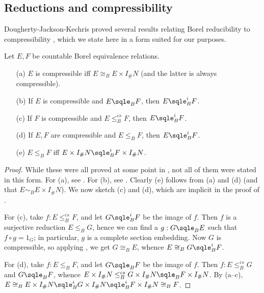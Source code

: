 \documentclass[11pt]{article}
\begin{document}
\subsection{Reductions and compressibility}
\label{sec:compress}

Dougherty-Jackson-Kechris proved several results relating Borel reducibility to compressibility \cite[2.3, 2.5, 2.6]{DJK}, which we state here in a form suited for our purposes.

\begin{proposition}
\label{thm:compress}
Let $E, F$ be countable Borel equivalence relations.
\begin{enumerate}
\item[(a)]  $E$ is compressible iff $E \cong_B E \times I_\#N$ (and the latter is always compressible).
\item[(b)]  If $E$ is compressible and $E \sqle_B F$, then $E \sqle_B^i F$.
\item[(c)]  If $F$ is compressible and $E \le_B^{cs} F$, then $E \sqle_B^i F$.
\item[(d)]  If $E, F$ are compressible and $E \le_B F$, then $E \sqle_B^i F$.
\item[(e)]  $E \le_B F$ iff $E \times I_\#N \sqle_B^i F \times I_\#N$.
\end{enumerate}
\end{proposition}
\begin{proof}
While these were all proved at some point in \cite{DJK}, not all of them were stated in this form.  For (a), see \cite[2.5]{DJK}.  For (b), see \cite[2.3]{DJK}.  Clearly (e) follows from (a) and (d) (and that $E \sim_B E \times I_\#N$).  We now sketch (c) and (d), which are implicit in the proof of \cite[2.6]{DJK}.

For (c), take $f : E \le_B^{cs} F$, and let $G \sqle_B^i F$ be the image of $f$.  Then $f$ is a surjective reduction $E \le_B G$, hence we can find a $g : G \sqle_B E$ such that $f \circ g = 1_G$; in particular, $g$ is a complete section embedding.  Now $G$ is compressible, so applying \cite[2.2]{DJK}, we get $G \cong_B E$, whence $E \cong_B G \sqle_B^i F$.

For (d), take $f : E \le_B F$, and let $G \sqle_B F$ be the image of $f$.  Then $f : E \le_B^{cs} G$ and $G \sqle_B F$, whence $E \times I_\#N \le_B^{cs} G \times I_\#N \sqle_B F \times I_\#N$.  By (a--c), $E \cong_B E \times I_\#N \sqle_B^i G \times I_\#N \sqle_B^i F \times I_\#N \cong_B F$.
\end{proof}
\end{document}
